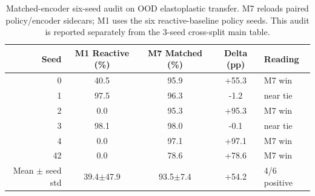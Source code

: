 \begin{table}[t]
\centering
\caption{Matched-encoder six-seed audit on OOD elastoplastic transfer. M7 reloads paired policy/encoder sidecars; M1 uses the six reactive-baseline policy seeds. This audit is reported separately from the 3-seed cross-split main table.}
\label{tab:matched_encoder_audit}
\footnotesize
\setlength{\tabcolsep}{4pt}
\begin{tabular}{@{}rcccl@{}}
\toprule
Seed & M1 Reactive (\%) & M7 Matched (\%) & Delta (pp) & Reading \\
\midrule
0 & 40.5 & 95.9 & +55.3 & M7 win \\
1 & 97.5 & 96.3 & -1.2 & near tie \\
2 & 0.0 & 95.3 & +95.3 & M7 win \\
3 & 98.1 & 98.0 & -0.1 & near tie \\
4 & 0.0 & 97.1 & +97.1 & M7 win \\
42 & 0.0 & 78.6 & +78.6 & M7 win \\
\midrule
Mean $\pm$ seed std & 39.4$\pm$47.9 & 93.5$\pm$7.4 & +54.2 & 4/6 positive \\
\bottomrule
\end{tabular}
\end{table}
